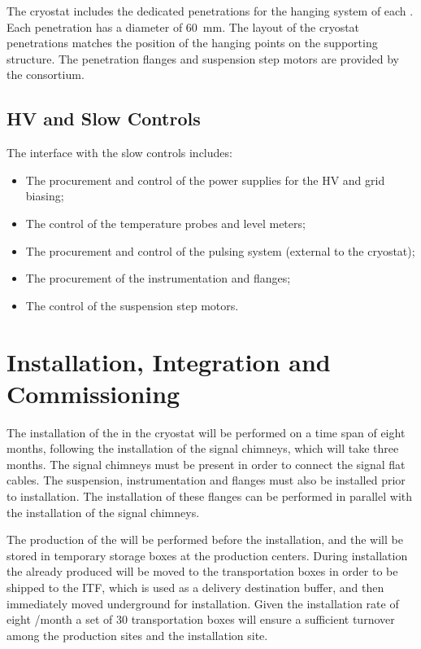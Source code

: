 The cryostat includes the dedicated penetrations for the hanging system of each . Each penetration has a diameter of \SI{60}{mm}. The layout of the cryostat penetrations   matches the position of the hanging points on the  supporting structure. The penetration flanges and  suspension step motors are provided by the  consortium.

\subsection{HV and Slow Controls}
\label{sec:fddp-crp-intfc-HV-slowcontrol}

The interface with the slow controls includes:

\begin{itemize}
\item The procurement and control of the power supplies for the HV and grid  biasing;
\item The control of the  temperature probes and level meters;
\item The procurement and control of the  pulsing system (external to the cryostat);
\item The procurement of the instrumentation and  \fdth flanges;
\item The control of the  suspension step motors.
\end{itemize}

\section{Installation, Integration and Commissioning}
\label{sec:fddp-crp-install}

The installation of the  in the cryostat will be performed on a time span of eight months, following the installation of the signal chimneys, which will take three months. The signal chimneys must be present in order to %
connect the  signal flat cables. The suspension, instrumentation and  flanges must also be  installed prior to  installation. The installation of these flanges can be performed in parallel with the installation of the signal chimneys. 

The production of the  will be performed before the installation, and the  will be stored in temporary storage boxes at the production centers. During installation the already produced  will be moved to the transportation boxes in order to be shipped to the ITF, which is used as a delivery destination buffer, and then immediately moved underground for installation. Given the installation rate of eight /month a set of \num{30} transportation boxes will ensure a sufficient turnover among the production sites and the installation site.

